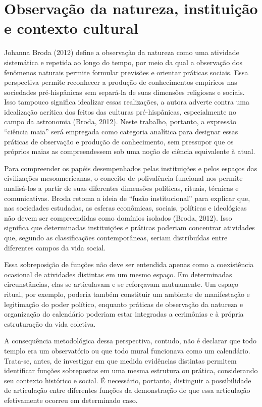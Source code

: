 \documentclass[11pt, a4paper]{article}
\begin{document}
\section{Observação da natureza, instituição e contexto cultural}

Johanna Broda (2012) define a observação da natureza como uma atividade sistemática e repetida ao longo do tempo, por meio da qual a observação dos fenômenos naturais permite formular previsões e orientar práticas sociais. Essa perspectiva permite reconhecer a produção de conhecimentos empíricos nas sociedades pré-hispânicas sem separá-la de suas dimensões religiosas e sociais. Isso tampouco significa idealizar essas realizações, a autora adverte contra uma idealização acrítica dos feitos das culturas pré-hispânicas, especialmente no campo da astronomia (Broda, 2012). Neste trabalho, portanto, a expressão “ciência maia” será empregada como categoria analítica para designar essas práticas de observação e produção de conhecimento, sem pressupor que os próprios maias as compreendessem sob uma noção de ciência equivalente à atual.

Para compreender os papéis desempenhados pelas instituições e pelos espaços das civilizações mesoamericanas, o conceito de polivalência funcional nos permite analisá-los a partir de suas diferentes dimensões políticas, rituais, técnicas e comunicativas. Broda retoma a ideia de “fusão institucional” para explicar que, nas sociedades estudadas, as esferas econômicas, sociais, políticas e ideológicas não devem ser compreendidas como domínios isolados (Broda, 2012). Isso significa que determinadas instituições e práticas poderiam concentrar atividades que, segundo as classificações contemporâneas, seriam distribuídas entre diferentes campos da vida social.

Essa sobreposição de funções não deve ser entendida apenas como a coexistência ocasional de atividades distintas em um mesmo espaço. Em determinadas circunstâncias, elas se articulavam e se reforçavam mutuamente. Um espaço ritual, por exemplo, poderia também constituir um ambiente de manifestação e legitimação do poder político, enquanto práticas de observação da natureza e organização do calendário poderiam estar integradas a cerimônias e à própria estruturação da vida coletiva.

A consequência metodológica dessa perspectiva, contudo, não é declarar que todo templo era um observatório ou que todo mural funcionava como um calendário. Trata-se, antes, de investigar em que medida evidências distintas permitem identificar funções sobrepostas em uma mesma estrutura ou prática, considerando seu contexto histórico e social. É necessário, portanto, distinguir a possibilidade de articulação entre diferentes funções da demonstração de que essa articulação efetivamente ocorreu em determinado caso.
\end{document}
